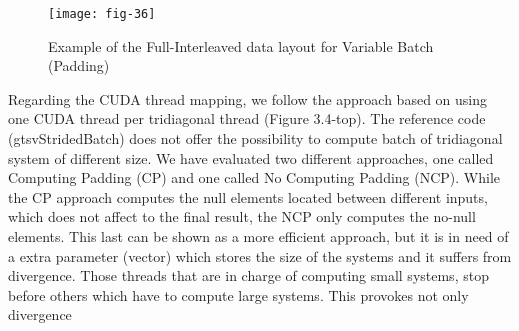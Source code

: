     \vspace{1ex}
    \begin{figure}[htbp]
        \centering
        \texttt{[image: fig-36]}
        \caption{Example of the Full-Interleaved data layout for Variable Batch (Padding)}
        \label{fig:fig-36}
    \end{figure}

Regarding the CUDA thread mapping, we follow the approach based on using one
CUDA thread per tridiagonal thread (Figure 3.4-top). The reference code (gtsvStridedBatch) does not offer the possibility to compute batch of tridiagonal system of different
size. We have evaluated two different approaches, one called Computing Padding (CP)
and one called No Computing Padding (NCP). While the CP approach computes the
null elements located between different inputs, which does not affect to the final result,
the NCP only computes the no-null elements. This last can be shown as a more efficient
approach, but it is in need of a extra parameter (vector) which stores the size of the
systems and it suffers from divergence. Those threads that are in charge of computing
small systems, stop before others which have to compute large systems. This provokes
not only divergence


